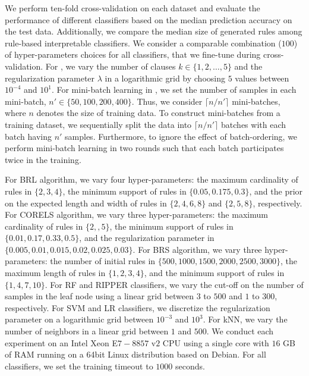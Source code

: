 We perform ten-fold cross-validation on each dataset and evaluate the performance of different classifiers based on the median prediction accuracy on the test data. Additionally, we compare the median size of generated rules among rule-based interpretable classifiers. We consider a comparable combination ($ 100 $) of  hyper-parameters choices for all classifiers, that we fine-tune during cross-validation. For {\imli}, we vary the number of clauses $ k \in \{1, 2, \dots, 5\} $ and the regularization parameter $ \lambda $  in a logarithmic grid by choosing $ 5 $ values between $ 10^{-4} $ and $ 10^1 $. For mini-batch learning in {\imli}, we set the number of samples in each mini-batch, $ n' \in \{50, 100, 200, 400\} $. Thus, we consider $ \lceil n / n' \rceil $ mini-batches, where $ n $ denotes the size of training data. To construct mini-batches from a training dataset, we sequentially split the data into $ \lceil n / n' \rceil $  batches with each batch having $ n' $ samples. Furthermore, to ignore the effect of batch-ordering, we perform mini-batch learning in two rounds such that each batch participates twice in the training.

For BRL algorithm, we vary four hyper-parameters: the maximum cardinality of rules in $ \{2, 3, 4\} $, the minimum support of rules in $ \{0.05, 0.175, 0.3\} $, and the prior on the expected length and width of rules in $ \{2, 4, 6, 8\} $ and $ \{2, 5, 8\} $, respectively. For CORELS algorithm, we vary three hyper-parameters:  the maximum cardinality of rules in $ \{2,, 5\} $, the minimum support of rules in $ \{0.01, 0.17, 0.33, 0.5  \} $, and the regularization parameter in $ \{0.005, 0.01 , 0.015, 0.02 , 0.025, 0.03\}  $. For BRS algorithm, we vary three hyper-parameters: the number of initial rules in $ \{500, 1000, 1500, 2000, 2500, 3000\} $, the maximum length of rules in $ \{1,2,3,4\} $, and the minimum support of rules in $ \{1, 4,7, 10\} $. For RF and RIPPER classifiers, we vary the cut-off on the number of samples in the leaf node using a linear grid between $ 3 $ to $ 500 $ and $ 1 $ to $ 300 $, respectively. For SVM and LR classifiers, we discretize the regularization parameter on a logarithmic grid between  $ 10^{-3} $ and $ 10^3 $. For kNN, we vary the number of neighbors in a linear grid between $ 1 $ and $ 500 $. We conduct each experiment on an Intel Xeon E$ 7-8857 $ v$ 2 $ CPU using a single core with $ 16 $ GB of RAM running on a 64bit Linux distribution based on Debian. For all classifiers, we set the training timeout to $ 1000 $ seconds. 


